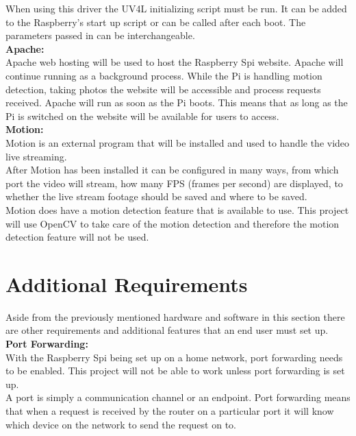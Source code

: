 \documentclass[12pt]{report}
\begin{document}
When using this driver the UV4L initializing script must be run. It can be added to the Raspberry's start up script or can be called after each boot. The parameters passed in can be interchangeable. \\


\noindent
{\bf Apache:}\\
\break
Apache web hosting will be used to host the Raspberry Spi website. Apache will continue running as a background process. While the Pi is handling motion detection, taking photos the website will be accessible and process requests received. Apache will run as soon as the Pi boots. This means that as long as the Pi is switched on the website will be available for users to access.\\ 

\noindent
{\bf Motion:}\\
\break
Motion is an external program that will be installed and used to handle the video live streaming.\\

After Motion has been installed it can be configured in many ways, from which port the video will stream, how many FPS (frames per second) are displayed, to whether the live stream footage should be saved and where to be saved.\\

Motion does have a motion detection feature that is available to use. This project will use OpenCV to take care of the motion detection and therefore the motion detection feature will not be used.\\

\clearpage
\section{Additional Requirements}	
\label{sec:additional}
Aside from the previously mentioned hardware and software in this section there are other requirements and additional features that an end user must set up.\\

\noindent
{\bf Port Forwarding:}\\
\break
With the Raspberry Spi being set up on a home network, port forwarding needs to be enabled. This project will not be able to work unless port forwarding is set up.\\

A port is simply a communication channel or an endpoint. Port forwarding means that when a request is received by the router on a particular port it will know which device on the network to send the request on to.\\
\end{document}

